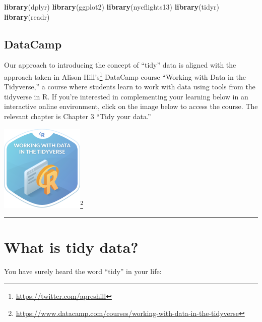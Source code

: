 \documentclass[12pt,]{krantz}
\makeatletter
\newenvironment{Shaded}{\begin{snugshade}}{\end{snugshade}}
\newcommand{\KeywordTok}[1]{\textcolor[rgb]{0.27,0.27,0.27}{\textbf{#1}}}
\newcommand{\NormalTok}[1]{#1}
\renewcommand{\href}[2]{#2\footnote{\url{#1}}}
\newenvironment{kframe}{%
\medskip{}
\setlength{\fboxsep}{.8em}
 \def\at@end@of@kframe{}%
 \ifinner\ifhmode%
  \def\at@end@of@kframe{\end{minipage}}%
  \begin{minipage}{\columnwidth}%
 \fi\fi%
 \def\FrameCommand##1{\hskip\@totalleftmargin \hskip-\fboxsep
 \colorbox{shadecolor}{##1}\hskip-\fboxsep
     \hskip-\linewidth \hskip-\@totalleftmargin \hskip\columnwidth}%
 \MakeFramed {\advance\hsize-\width
   \@totalleftmargin\z@ \linewidth\hsize
   \@setminipage}}%
 {\par\unskip\endMakeFramed%
 \at@end@of@kframe}
\renewenvironment{Shaded}{\begin{kframe}}{\end{kframe}}
\makeatother
\begin{document}
\begin{Shaded}
\begin{Highlighting}[]
\KeywordTok{library}\NormalTok{(dplyr)}
\KeywordTok{library}\NormalTok{(ggplot2)}
\KeywordTok{library}\NormalTok{(nycflights13)}
\KeywordTok{library}\NormalTok{(tidyr)}
\KeywordTok{library}\NormalTok{(readr)}
\end{Highlighting}
\end{Shaded}

\subsection*{DataCamp}\label{datacamp-1}


Our approach to introducing the concept of ``tidy'' data is aligned with
the approach taken in \href{https://twitter.com/apreshill}{Alison
Hill's} DataCamp course ``Working with Data in the Tidyverse,'' a course
where students learn to work with data using tools from the tidyverse in
R. If you're interested in complementing your learning below in an
interactive online environment, click on the image below to access the
course. The relevant chapter is Chapter 3 ``Tidy your data.''

\begin{center}
\href{https://www.datacamp.com/courses/working-with-data-in-the-tidyverse}{\includegraphics[width=0.3\textwidth]{images/datacamp_working_with_data.png}}
\end{center}

\begin{center}\rule{0.5\linewidth}{\linethickness}\end{center}

\section{What is tidy data?}\label{what-is-tidy-data}

You have surely heard the word ``tidy'' in your life:
\end{document}
